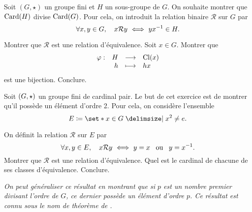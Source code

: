 \documentclass{magnolia}
\begin{document}
Soit $(G,\star)$ un groupe fini et $H$ un sous-groupe de $G$. On souhaite montrer
que $\operatorname{Card}(H)$ divise $\operatorname{Card}(G)$. Pour cela, on introduit la relation binaire $\mathcal{R}$
sur $G$ par
\[\forall x,y \in G\qsep x\mathcal{R}y \ \ssi\  yx^{-1}\in H.\]
\begin{questions}
\question Montrer que $\mathcal{R}$ est une relation d'équivalence.
\question Soit $x\in G$. Montrer que
  \[\begin{array}[t]{lrcl} \displaystyle{\varphi} : & \displaystyle{H} & \longrightarrow & \displaystyle{{\rm Cl}(x)} \\ & \displaystyle{h} & \longmapsto & \displaystyle{hx} \end{array}\]
  est une bijection.
\question Conclure.
\end{questions}







Soit $\left(G,\star\right)$ un groupe fini de cardinal pair. Le but de cet exercice est
de montrer qu'il possède un élément d'ordre 2.
Pour cela, on considère l'ensemble
\[E\defeq\enstq{x\in G}{x^2\neq e}.\]
\begin{questions}
\question On définit la relation $\mathcal{R}$ sur $E$ par
  \[\forall x, y\in E\qsep x\mathcal{R}y\ \ssi\ y=x \ou y=x^{-1}.\]
  Montrer que $\mathcal{R}$ est une relation d'équivalence. Quel est le cardinal
  de chacune de ses classes d'équivalence.
\question Conclure.
\end{questions}
\emph{On peut généraliser ce résultat en montrant que si $p$ est un nombre premier divisant l'ordre de $G$, ce dernier possède un élément d'ordre $p$. Ce résultat est connu sous le nom de théorème de .}
\end{document}

